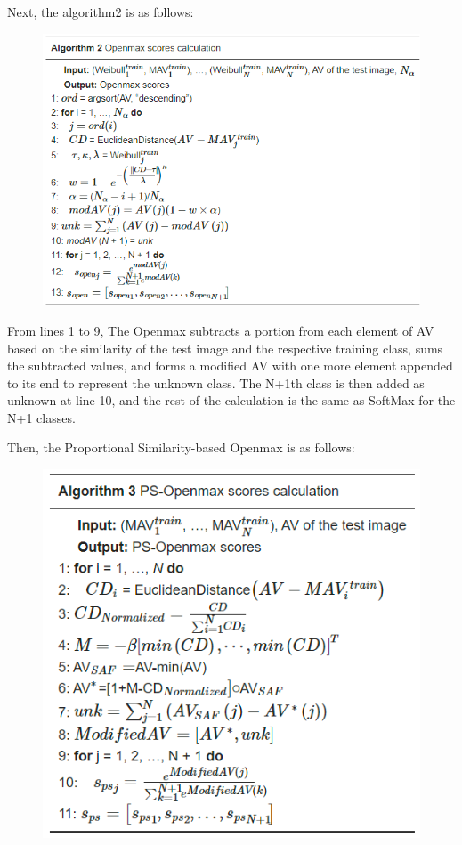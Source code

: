 \documentclass[dvipdfmx]{article}
\begin{document}
Next, the algorithm2 is as follows:
\begin{figure}[H]
\begin{center}
\includegraphics[width=\linewidth]{./img/openmax2_algo.png}
\end{center}
\end{figure}
From lines 1 to 9, The Openmax subtracts a portion from each element of AV based on the similarity of the test image and the respective training class, sums the subtracted values, and forms a modified AV with one more element appended to its end to represent the unknown class.
The N+1th class is then added as unknown at line 10, and the rest of the calculation is the same as SoftMax for the N+1 classes.

\newpage
Then, the Proportional Similarity-based Openmax is as follows:
\begin{figure}[H]
\begin{center}
\includegraphics[width=0.8\linewidth]{./img/openmax3_algo.png}
\end{center}
\end{figure}
\end{document}
